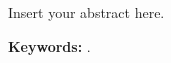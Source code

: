 \section*{\abstractname}

Insert your abstract here.

\vfill

\textbf{\Large Keywords:} \thesisKeywords.

